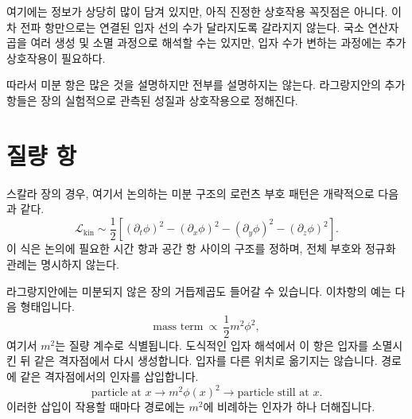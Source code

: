 여기에는 정보가 상당히 많이 담겨 있지만, 아직 진정한 상호작용 꼭짓점은 아니다. 이차 전파 항만으로는 연결된 입자 선의 수가 달라지도록 갈라지지 않는다. 국소 연산자 곱을 여러 생성 및 소멸 과정으로 해석할 수는 있지만, 입자 수가 변하는 과정에는 추가 상호작용이 필요하다.

\begin{classroomqa}
\end{classroomqa}


따라서 미분 항은 많은 것을 설명하지만 전부를 설명하지는 않는다. 라그랑지안의 추가 항들은 장의 실험적으로 관측된 성질과 상호작용으로 정해진다.

\section{질량 항}

스칼라 장의 경우, 여기서 논의하는 미분 구조의 로런츠 부호 패턴은 개략적으로 다음과 같다.
\begin{equation}
\mathcal{L}_{\mathrm{kin}}
\sim
\frac{1}{2}\left[
(\partial_t\phi)^2
-(\partial_x\phi)^2
-(\partial_y\phi)^2
-(\partial_z\phi)^2
\right].
\end{equation}
이 식은 논의에 필요한 시간 항과 공간 항 사이의 구조를 정하며, 전체 부호와 정규화 관례는 명시하지 않는다.

라그랑지안에는 미분되지 않은 장의 거듭제곱도 들어갈 수 있습니다. 이차항의 예는 다음 형태입니다.
\begin{equation}
\text{mass term}\ \propto\ \frac{1}{2}m^2\phi^2,
\end{equation}
여기서 \(m^2\)는 질량 계수로 식별됩니다. 도식적인 입자 해석에서 이 항은 입자를 소멸시킨 뒤 같은 격자점에서 다시 생성합니다. 입자를 다른 위치로 옮기지는 않습니다. 경로에 같은 격자점에서의 인자를 삽입합니다.
\begin{equation}
\text{particle at }x
\longrightarrow
\boxed{m^2\phi(x)^2}
\longrightarrow
\text{particle still at }x.
\end{equation}
이러한 삽입이 작용할 때마다 경로에는 \(m^2\)에 비례하는 인자가 하나 더해집니다.

